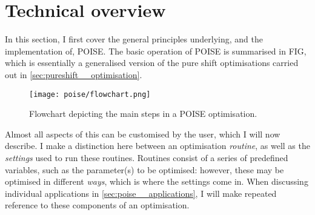\section{Technical overview}
\label{sec:poise__technical}

In this section, I first cover the general principles underlying, and the implementation of, POISE.
The basic operation of POISE is summarised in FIG, which is essentially a generalised version of the pure shift optimisations carried out in \cref{sec:pureshift__optimisation}.

\begin{figure}[htb]
    \centering
    \texttt{[image: poise/flowchart.png]}
    \caption[Flowchart for POISE optimisations]{Flowchart depicting the main steps in a POISE optimisation.}
    \label{fig:poise_flowchart}
\end{figure}

Almost all aspects of this can be customised by the user, which I will now describe.
I make a distinction here between an optimisation \textit{routine}, as well as the \textit{settings} used to run these routines.
Routines consist of a series of predefined variables, such as the parameter(s) to be optimised: however, these may be optimised in different \textit{ways}, which is where the settings come in.
When discussing individual applications in \cref{sec:poise__applications}, I will make repeated reference to these components of an optimisation.





